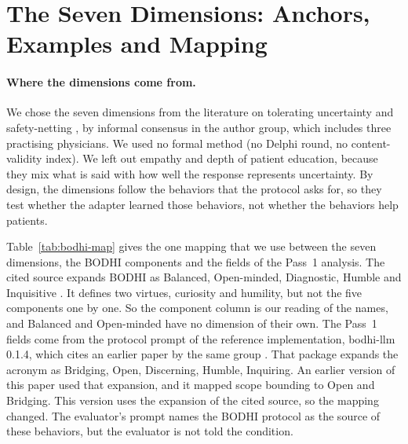 \documentclass{article}
\newcommand{\bodhi}{BODHI}
\begin{document}
\section{The Seven Dimensions: Anchors, Examples and Mapping}
\label{app:dimensions}

\paragraph{Where the dimensions come from.} We chose the seven dimensions from the literature on
tolerating uncertainty \citep{simpkin2016tolerating} and safety-netting \citep{jones2019safety}, by informal consensus in the author group, which includes three practising
physicians. We used no formal method (no Delphi round, no content-validity index). We left out
empathy and depth of patient education, because they mix what is said with how well the response
represents uncertainty. By design, the dimensions follow the behaviors that the protocol asks for,
so they test whether the adapter learned those behaviors, not whether the behaviors help patients.

Table~\ref{tab:bodhi-map} gives the one mapping that we use between the seven dimensions, the
\bodhi{} components and the fields of the Pass~1 analysis. The cited source expands \bodhi{} as
Balanced, Open-minded, Diagnostic, Humble and Inquisitive \citep{bodhi2026}. It defines two virtues,
curiosity and humility, but not the five components one by one. So the component column is our
reading of the names, and Balanced and Open-minded have no dimension of their own. The Pass~1
fields come from the protocol prompt of the reference implementation, bodhi-llm 0.1.4, which
cites an earlier paper by the same group \citep{bodhiplos2026}. That package expands the acronym
as Bridging, Open, Discerning, Humble, Inquiring. An earlier version of this
paper used that expansion, and it mapped scope bounding to Open and Bridging. This
version uses the expansion of the cited source, so the mapping changed. The evaluator's prompt
names the \bodhi{} protocol as the source of these behaviors, but the evaluator is not told the
condition.
\end{document}
